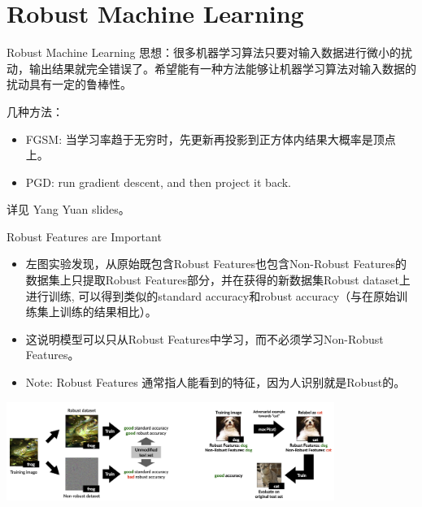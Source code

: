 \section{Robust Machine Learning}

\begin{frame}{Robust Machine Learning}
    思想：很多机器学习算法只要对输入数据进行微小的扰动，输出结果就完全错误了。希望能有一种方法能够让机器学习算法对输入数据的扰动具有一定的鲁棒性。

    几种方法：
    \begin{itemize}
        \item FGSM: 当学习率趋于无穷时，先更新再投影到正方体内结果大概率是顶点上。
        \item PGD: run gradient descent, and then project it back.
    \end{itemize}
    
    详见 Yang Yuan slides。
\end{frame}

\begin{frame}{Robust Features are Important}
    \begin{itemize}
        \item 左图实验发现，从原始既包含Robust Features也包含Non-Robust Features的数据集上只提取Robust Features部分，并在获得的新数据集Robust dataset上进行训练,
        可以得到类似的standard accuracy和robust accuracy（与在原始训练集上训练的结果相比）。
        \item 这说明模型可以只从Robust Features中学习，而不必须学习Non-Robust Features。
        \item Note: Robust Features 通常指人能看到的特征，因为人识别就是Robust的。
    \end{itemize}
    \begin{center}
        \includegraphics[width=0.8\textwidth]{assets/rml.png}
    \end{center}
\end{frame}


